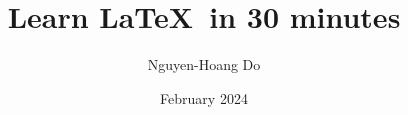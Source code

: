 \usepackage[a4paper, portrait, margin=1in]{geometry}

\title{Learn \LaTeX\ in 30 minutes}
\author{Nguyen-Hoang Do}
\date{February 2024}

\graphicspath{ {./images/} {./Examples/} }

\setlength{\parskip}{1\baselineskip plus 2pt}
\setlength{\parindent}{0pt}

\renewcommand{\contentsname}{Table of Contents}

